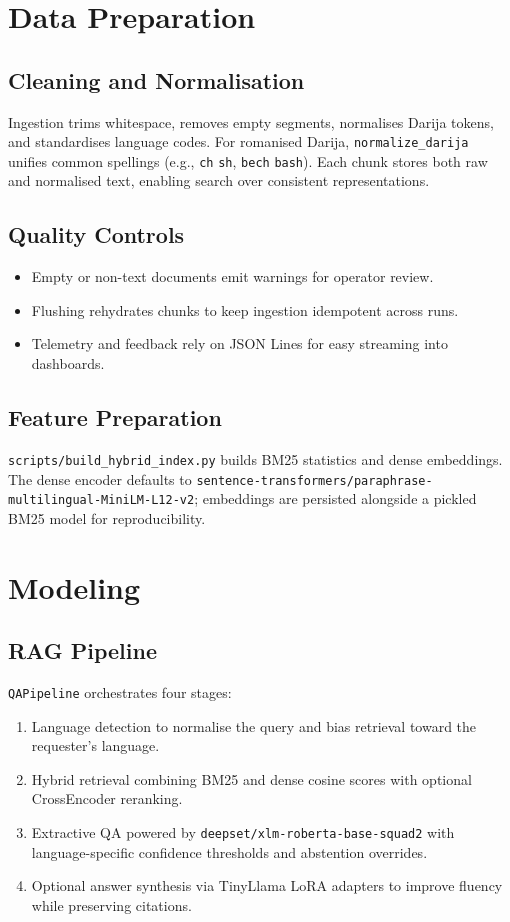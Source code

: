 \documentclass[12pt]{article}
\begin{document}
\section{Data Preparation}
\subsection{Cleaning and Normalisation}
Ingestion trims whitespace, removes empty segments, normalises Darija tokens, and standardises language codes. For romanised Darija, \texttt{normalize\_darija} unifies common spellings (e.g., \texttt{ch} \textrightarrow{} \texttt{sh}, \texttt{bech} \textrightarrow{} \texttt{bash}). Each chunk stores both raw and normalised text, enabling search over consistent representations.

\subsection{Quality Controls}
\begin{itemize}
    \item Empty or non-text documents emit warnings for operator review.
    \item Flushing rehydrates chunks to keep ingestion idempotent across runs.
    \item Telemetry and feedback rely on JSON Lines for easy streaming into dashboards.
\end{itemize}

\subsection{Feature Preparation}
\texttt{scripts/build\_hybrid\_index.py} builds BM25 statistics and dense embeddings. The dense encoder defaults to \texttt{sentence-transformers/paraphrase-multilingual-MiniLM-L12-v2}; embeddings are persisted alongside a pickled BM25 model for reproducibility.

\section{Modeling}
\subsection{RAG Pipeline}
\texttt{QAPipeline} orchestrates four stages:
\begin{enumerate}[label=\textbf{\alph*)}]
    \item Language detection to normalise the query and bias retrieval toward the requester's language.
    \item Hybrid retrieval combining BM25 and dense cosine scores with optional CrossEncoder reranking.
    \item Extractive QA powered by \texttt{deepset/xlm-roberta-base-squad2} with language-specific confidence thresholds and abstention overrides.
    \item Optional answer synthesis via TinyLlama LoRA adapters to improve fluency while preserving citations.
\end{enumerate}
\end{document}
